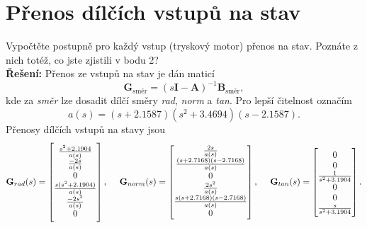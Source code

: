 \documentclass[twoside]{article}
\begin{document}
\section{Přenos dílčích vstupů na stav}
\label{sec:ukol3}
Vypočtěte postupně pro každý vstup (tryskový motor) přenos na stav. Poznáte z nich totéž, co jste zjistili
v bodu 2? \\
\textbf{Řešení:}
Přenos ze vstupů na stav je dán maticí 
\begin{equation}
	\mathbf{G}_{\text{směr}} = (s\mathbf{I}-\mathbf{A})^{-1} \mathbf{B}_{\text{směr}},
	\label{eq:prenos_vztah}
\end{equation}
kde za \textit{směr} lze dosadit dílčí směry \textit{rad}, \textit{norm} a \textit{tan}.
Pro lepší čitelnost označím
\begin{equation}
	a(s) = (s+2.1587)(s^2+3.4694)(s-2.1587).
	\label{eq:subs}
\end{equation}
Přenosy dílčích vstupů na stavy jsou
\begin{equation}
	\label{eq:prenosy}
	\mathbf{G}_{rad}(s) = \begin{bmatrix}
		
		\frac{s^2+2.1904     }{a(s)}          \\                
		\frac{-2s        }{a(s)}                   \\               
		0                                    \\            
		\frac{s(s^2+2.1904)}{a(s)}              \\
		\frac{-2s^2}{a(s)}                         \\               
		0                                                
	\end{bmatrix}, ~~~~                                                    
		\mathbf{G}_{norm}(s) =                       
		\begin{bmatrix}
			
			\frac{2s}{a(s)}                                               \\
			\frac{(s+2.7168)(s-2.7168) }{a(s)}                \\           
			0                                        \\             
			\frac{2s^2                  }{a(s)}           \\
			\frac{s(s+2.7168)(s-2.7168)}{a(s)}             \\              
			0                                                     
		\end{bmatrix}, ~~~~
		\mathbf{G}_{tan}(s) = \begin{bmatrix}
			
			0                              \\   
			0                             \\    
			\frac{1}{s^2+3.1904}     \\       
			0                              \\
			0                               \\   
			\frac{s}{s^2+3.1904}                           
		\end{bmatrix}.
\end{equation}
\end{document}
